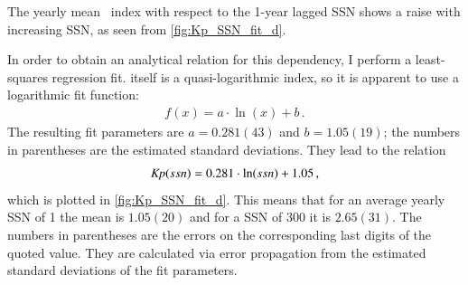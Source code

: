 The yearly mean \Kp~index with respect to the 1-year lagged SSN shows a raise with increasing SSN, as seen from \autoref{fig:Kp_SSN_fit_d}.
\begin{figure}
\end{figure}
In order to obtain an analytical relation for this dependency, I perform a least-squares regression fit. \Kp{} itself is a quasi-logarithmic index, so it is apparent to use a logarithmic fit function:
\begin{align}
	f(x) = a \cdot \ln(x) + b	\,.	\label{eq:log_fit_function}
\end{align}
The resulting fit parameters are $a = 0.281(43)$ and $b = 1.05(19)$; the numbers in parentheses are the estimated standard deviations.
They lead to the relation
\begin{align}
	\textit{Kp}(ssn) = 0.281 \cdot \ln(ssn) + 1.05	\,,	\label{eq:kp_ssn_relation}
\end{align}
which is plotted in \autoref{fig:Kp_SSN_fit_d}. This means that for an average yearly SSN of 1 the mean \Kp{} is $1.05(20)$ and for a SSN of 300 it is $2.65(31)$. The numbers in parentheses are the errors on the corresponding last digits of the quoted value. They are calculated via error propagation from the estimated standard deviations of the fit parameters.

